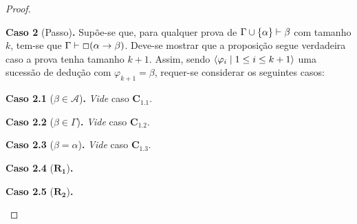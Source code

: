 \begin{proof}
        \begin{case}
            \textbf{Caso 2} (Passo)\textbf{.}
            Supõe-se que, para qualquer prova de $\Gamma\cup\{\alpha\}\vdash\beta$ com tamanho $k$, tem-se que $\Gamma\vdash\Box(\alpha\to\beta)$.
            Deve-se mostrar que a proposição segue verdadeira caso a prova tenha tamanho $k+1$. 
            Assim, sendo $\langle\varphi_i\mid1\leq i\leq k+1\rangle$ uma sucessão de dedução com $\varphi_{k+1}=\beta$, requer-se considerar os seguintes casos:

            \begin{case}
                \textbf{Caso 2.1} ($\beta\in\mathcal{A}$)\textbf{.} \textit{Vide} caso $\mathbf{C_{1.1}}$.
            \end{case}

            \begin{case}
                \textbf{Caso 2.2} ($\beta\in\Gamma$)\textbf{.} \textit{Vide} caso $\mathbf{C_{1.2}}$.
            \end{case}

            \begin{case}
                \textbf{Caso 2.3} ($\beta=\alpha$)\textbf{.} \textit{Vide} caso $\mathbf{C_{1.3}}$.
            \end{case}

            \begin{case}
                \textbf{Caso 2.4} ($\mathbf{R_1}$)\textbf{.} 
            \end{case}

            \begin{case}
                \textbf{Caso 2.5} ($\mathbf{R_2}$)\textbf{.} 
            \end{case}
        \end{case}
    \end{proof}